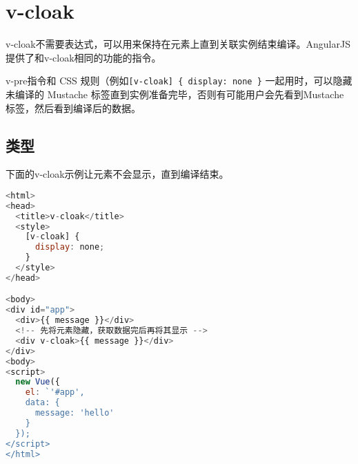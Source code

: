 \begin{lstlisting}[language=JavaScript]

\end{lstlisting}




\begin{lstlisting}[language=JavaScript]

\end{lstlisting}

\section{v-cloak}

v-cloak不需要表达式，可以用来保持在元素上直到关联实例结束编译。AngularJS提供了和v-cloak相同的功能的指令。

v-pre指令和 CSS 规则（例如\texttt{[v-cloak] \{ display: none \}} 一起用时，可以隐藏未编译的 Mustache 标签直到实例准备完毕，否则有可能用户会先看到Mustache标签，然后看到编译后的数据。



\subsection{类型}

下面的v-cloak示例让元素不会显示，直到编译结束。

\begin{lstlisting}[language=JavaScript]
<html>
<head>
  <title>v-cloak</title>
  <style>
    [v-cloak] {
      display: none;
    }
  </style>
</head>

<body>
<div id="app">
  <div>{{ message }}</div>
  <!-- 先将元素隐藏，获取数据完后再将其显示 -->
  <div v-cloak>{{ message }}</div>
</div>
<body>
<script>
  new Vue({
    el: `'#app',
    data: {
      message: 'hello'
    }
  });
</script>
</html>
\end{lstlisting}



\begin{lstlisting}[language=JavaScript]

\end{lstlisting}




\begin{lstlisting}[language=JavaScript]

\end{lstlisting}




\begin{lstlisting}[language=JavaScript]

\end{lstlisting}




